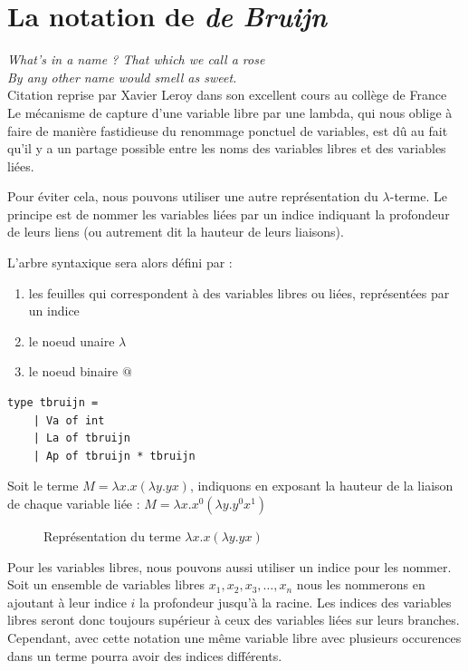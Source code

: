 \documentclass[11pt]{book}
\begin{document}
\section{La notation de \textit{de Bruijn}}
\noindent
\textit{What's in a name ? That which we call a rose \\
	   By any other name would smell as sweet.}\cite{WS} \\
	   Citation reprise par Xavier Leroy dans
	   son excellent cours au collège de France \\

\vspace{0.4cm}
Le mécanisme de capture d'une variable libre par une lambda, qui nous oblige à faire de manière fastidieuse
du renommage ponctuel de variables, est dû au fait qu'il y a un partage possible entre les noms des variables
libres et des variables liées. 

Pour éviter cela, nous pouvons utiliser une autre représentation du $\lambda$-terme. Le principe est
de nommer les variables liées par un indice indiquant la profondeur de leurs liens (ou autrement dit la
hauteur de leurs liaisons).

L'arbre syntaxique sera alors défini par :
\begin{enumerate}
	\item les feuilles qui correspondent à des variables libres ou liées, représentées par un indice
	\item le noeud unaire $\lambda$
	\item le noeud binaire $@$
\end{enumerate}

\begin{Verbatim}
type tbruijn =
	| Va of int
	| La of tbruijn 
	| Ap of tbruijn * tbruijn
\end{Verbatim}
	
Soit le terme $M=\lambda x.x(\lambda y. yx)$, indiquons en exposant la hauteur de la liaison
de chaque variable liée : $M=\lambda x.x^0(\lambda y. y^0x^1)$
\begin{figure}[H]
\centering
\caption{Représentation du terme $\lambda x.x(\lambda y. yx)$}
\end{figure}

Pour les variables libres, nous pouvons aussi utiliser un indice pour les nommer.
Soit un ensemble de variables libres ${x_1, x_2, x_3,\dots, x_n}$ nous les nommerons en ajoutant 
à leur indice $i$ la profondeur jusqu'à la racine. Les indices des variables libres seront
 donc toujours supérieur à ceux des variables liées sur leurs branches. Cependant, avec cette notation une
 même variable libre avec plusieurs occurences dans un terme pourra avoir des indices différents.
\end{document}
